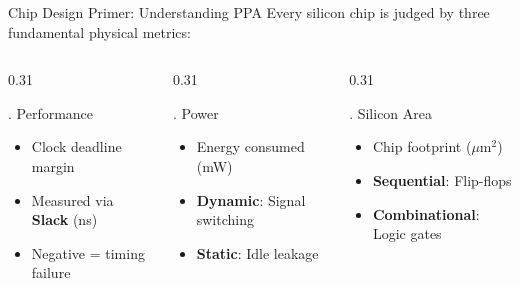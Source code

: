 \documentclass[aspectratio=169,10pt]{beamer}
\begin{document}
\begin{frame}{Chip Design Primer: Understanding PPA}
    Every silicon chip is judged by three fundamental physical metrics:
    \vspace{0.2cm}
    \begin{columns}[T]
        \begin{column}{0.31\textwidth}
            \begin{block}{. Performance}
                \footnotesize
                \begin{itemize}
                    \item Clock deadline margin
                    \item Measured via \textbf{Slack} (ns)
                    \item Negative = timing failure
                \end{itemize}
            \end{block}
        \end{column}
        \begin{column}{0.31\textwidth}
            \begin{block}{. Power}
                \footnotesize
                \begin{itemize}
                    \item Energy consumed (mW)
                    \item \textbf{Dynamic}: Signal switching
                    \item \textbf{Static}: Idle leakage
                \end{itemize}
            \end{block}
        \end{column}
        \begin{column}{0.31\textwidth}
            \begin{block}{. Silicon Area}
                \footnotesize
                \begin{itemize}
                    \item Chip footprint ($\mu\text{m}^2$)
                    \item \textbf{Sequential}: Flip-flops
                    \item \textbf{Combinational}: Logic gates
                \end{itemize}
            \end{block}
        \end{column}
    \end{columns}
\end{frame}
\end{document}
